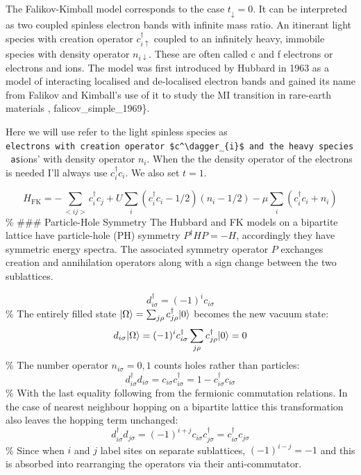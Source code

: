 The Falikov-Kimball model corresponds to the case
\(t_{\downarrow} = 0\). It can be interpreted as two coupled spinless
electron bands with infinite mass ratio. An itinerant light species with
creation operator \(c^\dagger_{i\uparrow}\) coupled to an infinitely
heavy, immobile species with density operator \(n_{i\downarrow}\). These
are often called c and f electrons or electrons and ions. The model was
first introduced by Hubbard in 1963 as a model of interacting localised
and de-localised electron bands and gained its name from Falikov and
Kimball's use of it to study the MI transition in rare-earth materials
\textcite{hubbard_j._electron_1963}, falicov\_simple\_1969\}.

Here we will use refer to the light spinless species as
\texttt{electrons\textquotesingle{}\ with\ creation\ operator\ \$c\^{}\textbackslash{}dagger\_\{i\}\$\ and\ the\ heavy\ species\ as}ions'
with density operator \(n_i\). When the the density operator of the
electrons is needed I'll always use \(c^\dagger_{i}c_{i}\). We also set
\(t = 1\).

\[
    H_{\mathrm{FK}} = -\sum_{<ij>} c^\dagger_{i}c_{j} + U \sum_{i} (c^\dagger_{i}c_{i} - 1/2)( n_i - 1/2) - \mu \sum_i \left(c^\dagger_{i}c_{i} + n_{i}\right)
\] \% \#\#\# Particle-Hole Symmetry The Hubbard and FK models on a
bipartite lattice have particle-hole (PH) symmetry
\(P^\dagger H P = - H\), accordingly they have symmetric energy spectra.
The associated symmetry operator \(P\) exchanges creation and
annihilation operators along with a sign change between the two
sublattices.

\[ d^\dagger_{i\sigma} = (-1)^i c_{i\sigma}\] \% The entirely filled
state \(|\Omega\rangle = \sum_{j\rho} c^\dagger_{j\rho} |0\rangle\) becomes
the new vacuum state:
\[d_{i\sigma} |\Omega\rangle = (-1)^i c^\dagger_{i\sigma} \sum_{j\rho} c^\dagger_{j\rho} |0\rangle = 0\]
\% The number operator \(n_{i\sigma} = 0,1\) counts holes rather than
particles:
\[ d^\dagger_{i\sigma} d_{i \sigma} = c_{i\sigma} c^\dagger_{i\sigma} = 1 - c^\dagger_{i\sigma} c_{i\sigma}\]
\% With the last equality following from the fermionic commutation
relations. In the case of nearest neighbour hopping on a bipartite
lattice this transformation also leaves the hopping term unchanged:
\[ d^\dagger_{i\sigma} d_{j \sigma} = (-1)^{i+j} c_{i\sigma} c^\dagger_{j\sigma} = c^\dagger_{i\sigma} c_{j\sigma} \]
\% Since when \(i\) and \(j\) label sites on separate sublattices,
\((-1)^{i-j} = -1\) and this is absorbed into rearranging the operators
via their anti-commutator.

